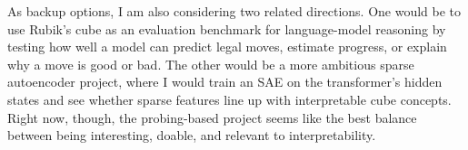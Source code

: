 \documentclass[12pt]{article}
\begin{document}
As backup options, I am also considering two related directions. One would be to use Rubik's cube as an evaluation benchmark for language-model reasoning by testing how well a model can predict legal moves, estimate progress, or explain why a move is good or bad. The other would be a more ambitious sparse autoencoder project, where I would train an SAE on the transformer's hidden states and see whether sparse features line up with interpretable cube concepts. Right now, though, the probing-based project seems like the best balance between being interesting, doable, and relevant to interpretability.




\end{document}
